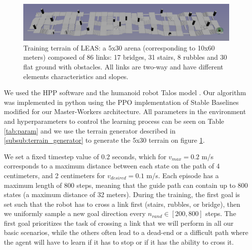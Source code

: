 \begin{figure}
    \centering
    \includegraphics[width=\textwidth]{Figures/Chapter_LEAS/arena_5x30.png}
    \caption{Training terrain of LEAS: a 5x30 arena (corresponding to 10x60 meters) composed of 86 links: 17 bridges, 31 stairs, 8 rubbles and 30 flat ground with obstacles. All links are two-way and have different elements characteristics and slopes.}
    \label{fig:arena_5x30}
\end{figure}

We used the HPP software \cite{HPP_software} and the humanoid robot Talos model \cite{talos_robot}. Our algorithm was implemented in python using the PPO implementation of Stable Baselines \cite{stable-baselines} modified for our Master-Workers architecture.
All parameters in the environment and hyperparameters to control the learning process can be seen on Table \ref{tab:param} and we use the terrain generator described in \ref{subsub:terrain_generator} to generate the 5x30 terrain on figure \ref{fig:arena_5x30}.

We set a fixed timestep value of $0.2$ seconds, which for $v_{max}=0.2$ m/s corresponds to a maximum distance between each state on the path of 4 centimeters, and 2 centimeters for $v_{desired}=0.1$ m/s.
Each episode has a maximum length of $800$ steps, meaning that the guide path can contain up to $800$ states (a maximum distance of 32 meters). During the training, the first goal is set such that the robot has to cross a link first (stairs, rubbles, or bridge), then we uniformly sample a new goal direction every $n_{rand} \in [200,800]$ steps. The first goal prioritizes the task of crossing a link that we will perform in all our basic scenarios, while the others often lead to a dead-end or a difficult path where the agent will have to learn if it has to stop or if it has the ability to cross it.

